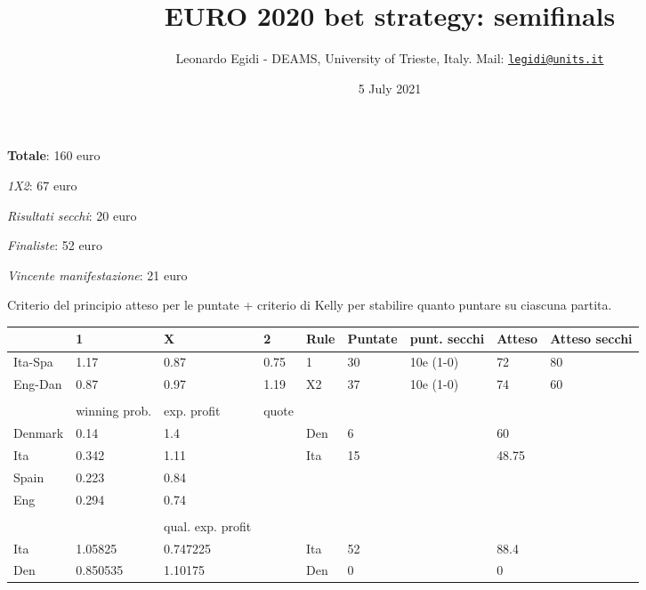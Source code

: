\documentclass[
  10pt,
]{article}
\title{EURO 2020 bet strategy: semifinals}
\author{Leonardo Egidi - DEAMS, University of Trieste, Italy. Mail:
\href{mailto:legidi@units.it}{\nolinkurl{legidi@units.it}}}
\date{5 July 2021}
\begin{document}
\maketitle

{
\setcounter{tocdepth}{2}
\tableofcontents
}
\textbf{Totale}: 160 euro

\emph{1X2}: 67 euro

\emph{Risultati secchi}: 20 euro

\emph{Finaliste}: 52 euro

\emph{Vincente manifestazione}: 21 euro

Criterio del principio atteso per le puntate + criterio di Kelly per
stabilire quanto puntare su ciascuna partita.

\begin{longtable}[]{@{}lllllllll@{}}
\toprule
& 1 & X & 2 & Rule & Puntate & punt. secchi & Atteso & Atteso
secchi\tabularnewline
\midrule
\endhead
Ita-Spa & 1.17 & 0.87 & 0.75 & 1 & 30 & 10e (1-0) & 72 &
80\tabularnewline
Eng-Dan & 0.87 & 0.97 & 1.19 & X2 & 37 & 10e (1-0) & 74 &
60\tabularnewline
&  &  & & & & \tabularnewline
& winning prob. & exp. profit & quote  & & & \tabularnewline
\bottomrule
Denmark & 0.14 & 1.4 & & Den & 6 & & 60 &\tabularnewline
Ita & 0.342 & 1.11 & & Ita & 15 & & 48.75 &\tabularnewline
Spain & 0.223 & 0.84 & & & & & &\tabularnewline
Eng & 0.294 & 0.74 & & & & & &\tabularnewline
&  &  & & & & \tabularnewline
& &qual. exp. profit &   & & & \tabularnewline
\bottomrule
Ita & 1.05825 & 0.747225 & & Ita & 52 & & 88.4 &\tabularnewline
Den & 0.850535 & 1.10175 & & Den & 0 & & 0 &\tabularnewline
\bottomrule
\end{longtable}
\end{document}
